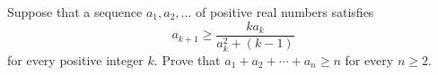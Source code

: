 Suppose that a sequence $a_1, a_2, \ldots$ of positive real numbers satisfies
\[
a_{k+1} \geq \frac{k a_k}{a_k^2 + (k-1)}
\]
for every positive integer $k$. Prove that $a_1 + a_2 + \cdots + a_n \geq n$ for every $n \geq 2$.
